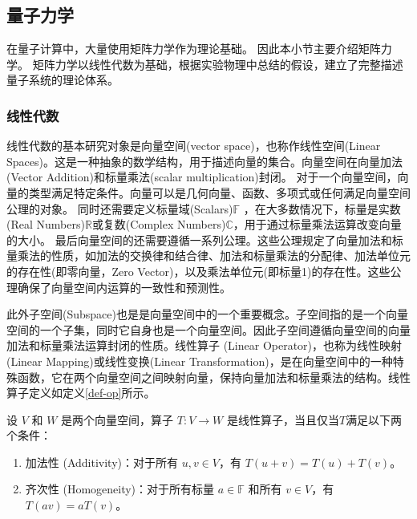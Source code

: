 \subsection{量子力学}
在量子计算中，大量使用矩阵力学作为理论基础。
因此本小节主要介绍矩阵力学。
矩阵力学以线性代数为基础，根据实验物理中总结的假设，建立了完整描述量子系统的理论体系。
\subsubsection*{线性代数}
线性代数的基本研究对象是向量空间(vector space)，也称作线性空间(Linear Spaces)。这是一种抽象的数学结构，用于描述向量的集合。向量空间在向量加法(Vector Addition)和标量乘法(scalar multiplication)封闭\cite{greub2012linear}。
对于一个向量空间，向量的类型满足特定条件。向量可以是几何向量、函数、多项式或任何满足向量空间公理的对象。
同时还需要定义标量域(Scalars)\(\mathbb{F}\) ，在大多数情况下，标量是实数(Real Numbers)\(\mathbb{R}\)或复数(Complex Numbers)\(\mathbb{C}\)，用于通过标量乘法运算改变向量的大小。
最后向量空间的还需要遵循一系列公理。这些公理规定了向量加法和标量乘法的性质，如加法的交换律和结合律、加法和标量乘法的分配律、加法单位元的存在性(即零向量，Zero Vector)，以及乘法单位元(即标量1)的存在性。这些公理确保了向量空间内运算的一致性和预测性。

此外子空间(Subspace)也是是向量空间中的一个重要概念。子空间指的是一个向量空间的一个子集，同时它自身也是一个向量空间。因此子空间遵循向量空间的向量加法和标量乘法运算封闭的性质。线性算子 (Linear Operator)，也称为线性映射(Linear Mapping)或线性变换(Linear Transformation)，是在向量空间中的一种特殊函数，它在两个向量空间之间映射向量，保持向量加法和标量乘法的结构。线性算子定义如定义\ref{def-op}所示。%
\begin{definition}\citep{greub2012linear}
    \label{def-op}
    设 \(V\) 和 \(W\) 是两个向量空间，算子 \(T: V \rightarrow W\) 是线性算子，当且仅当\(T\)满足以下两个条件：
\begin{enumerate}
    \item 加法性 (Additivity)：对于所有 \(u, v \in V\)，有 \(T(u + v) = T(u) + T(v)\)。
    \item 齐次性 (Homogeneity)：对于所有标量 \(a \in \mathbb{F}\) 和所有 \(v \in V\)，有 \(T(av) = aT(v)\)。
\end{enumerate}
\end{definition}

